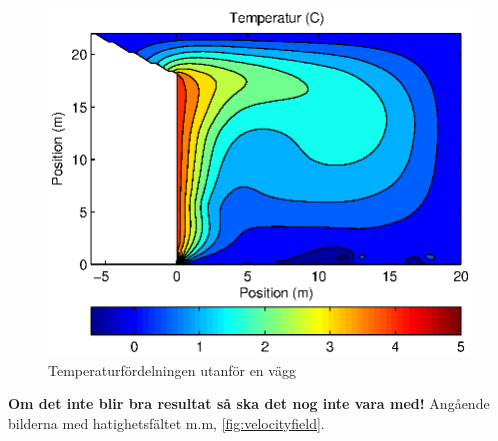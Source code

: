 \begin{figure}[hpbt]
\centering
\includegraphics{images/convectemperature.eps}
\caption{\label{fig:temp_dist}Temperaturfördelningen utanför en vägg}
\end{figure}


\textbf{\color{red} Om det inte blir bra resultat så ska det nog inte vara med!} Angående bilderna med hatighetsfältet m.m, \ref{fig:velocityfield}.

